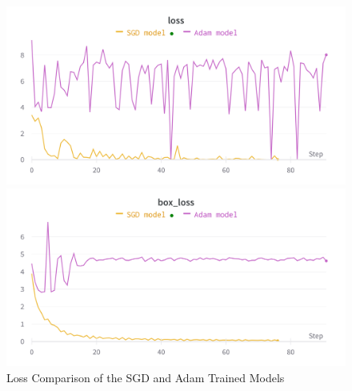 \documentclass{article}
\begin{document}
\begin{figure}
    \begin{minipage}{0.48\textwidth}
        \includegraphics[width=\textwidth]{comparison_loss.png}
    \end{minipage}
    \begin{minipage}{0.48\textwidth}
        \includegraphics[width=\textwidth]{comparison_box_loss.png}
    \end{minipage}
    \caption{Loss Comparison of the SGD and Adam Trained Models}
    \label{fig:loss_comparison}
\end{figure}
\end{document}
